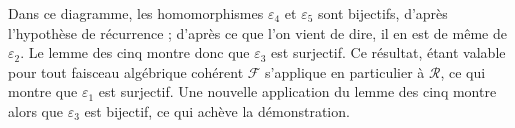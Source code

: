 \begin{center}
\end{center}
Dans ce diagramme, les homomorphismes $\varepsilon_4$ et $\varepsilon_5$ sont bijectifs, d'après l'hypothèse de récurrence ; d'après ce que l'on vient de dire, il en est de même de $\varepsilon_2$. Le lemme des cinq montre donc que $\varepsilon_3$ est surjectif. Ce résultat, étant valable pour tout faisceau algébrique cohérent $\mathcal{F}$ s'applique en particulier à $\mathcal{R}$, ce qui montre que $\varepsilon_1$ est surjectif. Une nouvelle application du lemme des cinq montre alors que $\varepsilon_3$ est bijectif, ce qui achève la démonstration.


